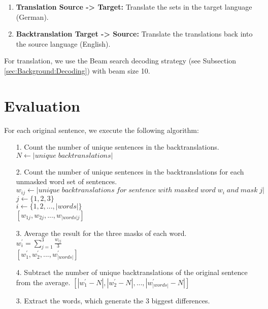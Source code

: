 \begin{enumerate}
    \item \textbf{Translation Source -> Target:} Translate the sets in the target language (German).
    \item \textbf{Backtranslation Target -> Source:} Translate the translations back into the source language (English).
\end{enumerate}

For translation, we use the Beam search decoding strategy (see Subsection \ref{sec:Background:Decoding}) with beam size 10.

\section{Evaluation}
\label{sec:Real_Experiment:Evaluation}

For each original sentence, we execute the following algorithm:
\begin{enumerate}
    \item[1. ] Count the number of unique sentences in the backtranslations. \\
    $N \leftarrow |unique \; backtranslations|$ 
    \item[2. ] Count the number of unique sentences in the backtranslations for each unmasked word set of sentences. \\
    $w_{ij} \leftarrow |unique \; backtranslations \; for \; sentence \; with \; masked \; word \; w_{i} \; and \; mask \; j|$ \\
    $j \leftarrow \{1, 2, 3\}$ \\
    $i \leftarrow \{1, 2, ..., |words|\}$ \\
    $[w_{1j}, w_{2j}, ..., w_{|words|j}]$
    \item[3. ] Average the result for the three masks of each word. \\ 
    $w_{i}^{'} = \sum_{j=1}^{3} \frac{w_{ij}}{3} $ \\
    $[w_{1}^{'}, w_{2}^{'}, ..., w_{|words|}^{'}]$
    \item[4. ] Subtract the number of unique backtranslations of the original sentence from the average.
    $[|w_{1}^{'} - N|, |w_{2}^{'} - N|, ..., |w_{|words|}^{'} - N|]$ 
    \item[3.] Extract the words, which generate the 3 biggest differences. 
    
\end{enumerate}


